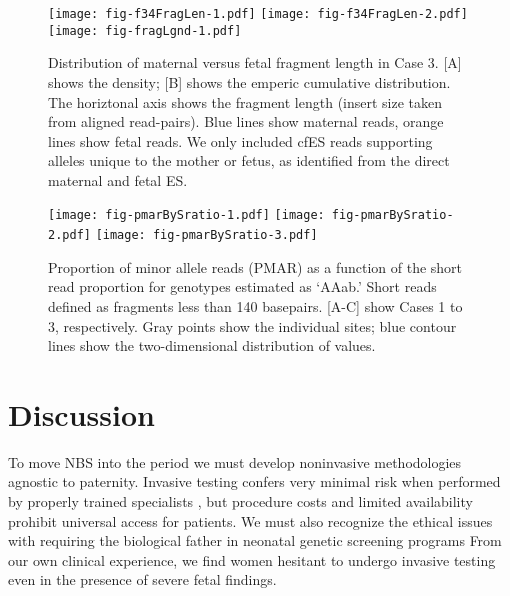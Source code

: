 \documentclass{article}\usepackage[]{graphicx}\usepackage[]{color}
\begin{document}
\begin{figure}
  \centering
  \texttt{[image: fig-f34FragLen-1.pdf]}%
  \texttt{[image: fig-f34FragLen-2.pdf]}
  \texttt{[image: fig-fragLgnd-1.pdf]}
  \caption{Distribution of maternal versus fetal fragment length in Case 3. [A] shows the density; [B] shows the emperic cumulative distribution. The horiztonal axis shows the fragment length (insert size taken from aligned read-pairs). Blue lines show maternal reads, orange lines show fetal reads. We only included cfES reads supporting alleles unique to the mother or fetus, as identified from the direct maternal and fetal ES.}
  \label{fig:c3fragLen}
\end{figure}

\begin{figure}
  \centering
  \texttt{[image: fig-pmarBySratio-1.pdf]}%
  \texttt{[image: fig-pmarBySratio-2.pdf]}%
  \texttt{[image: fig-pmarBySratio-3.pdf]}
  \caption{Proportion of minor allele reads (PMAR) as a function of the short read proportion for genotypes estimated as `AAab.' Short reads defined as fragments less than 140 basepairs. [A-C] show Cases 1 to 3, respectively. Gray points show the individual sites; blue contour lines show the two-dimensional distribution of values.}
  \label{fig:pmarBySratio}
\end{figure}

\section{Discussion}

To move NBS into the  period we must develop noninvasive methodologies agnostic to paternity.
Invasive testing confers very minimal risk when performed by properly trained specialists \cite{salomon:2019aa}, but procedure costs and limited availability prohibit universal access for patients.
We must also recognize the ethical issues with requiring the biological father in neonatal genetic screening programs
From our own clinical experience, we find women hesitant to undergo invasive testing even in the presence of severe fetal findings.
\end{document}
